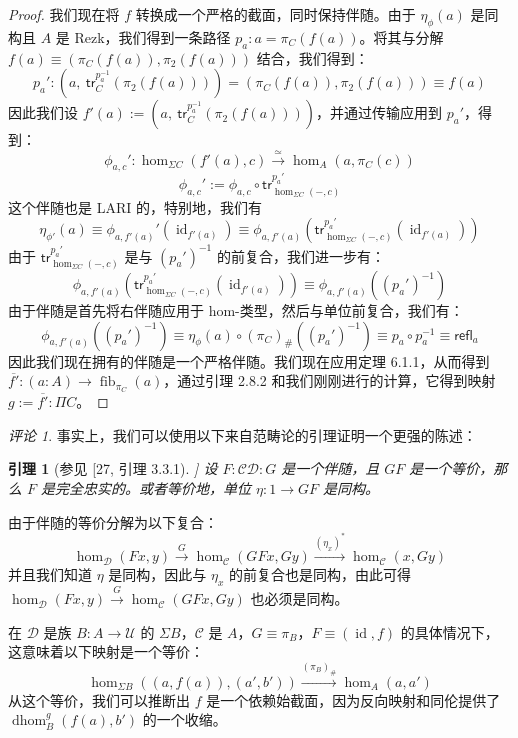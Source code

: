 \documentclass{ctexrep}
\theoremstyle{plain}
\newtheorem{lemma}[theorem]{引理}
\theoremstyle{definition}
\theoremstyle{remark}
\newtheorem{remark}[theorem]{评论}
\theoremstyle{definition}
\theoremstyle{definition}
\theoremstyle{definition}
\newcommand{\coloneqq}{\mathrel{:=}}
\newcommand{\fib}{\operatorname{fib}}
\newcommand{\tr}{\mathsf{tr}}
\newcommand{\refl}{\mathsf{refl}}
\newcommand{\id}{\operatorname{id}}
\newcommand{\UU}{\mathcal{U}}
\newcommand{\dhom}{\operatorname{dhom}}
\begin{document}
\begin{proof}
我们现在将 $f$ 转换成一个严格的截面，同时保持伴随。由于 $\eta_\phi(a)$ 是同构且 $A$ 是 Rezk，我们得到一条路径 $p_a:a = \pi_C(f(a))$。将其与分解 $f(a) \equiv (\pi_C(f(a)), \pi_2(f(a)))$ 结合，我们得到：
\[
p_a': \left(a,\ \tr_C^{p_a^{-1}}(\pi_2(f(a)))\right) = (\pi_C(f(a)),\pi_2(f(a))) \equiv f(a)
\]
因此我们设 $f'(a) \coloneqq \left(a,\ \tr_C^{p_a^{-1}}(\pi_2(f(a)))\right)$，并通过传输应用到 $p_a'$，得到：
\[
\phi_{a,c}': \hom_{\Sigma C}(f'(a),c) \xrightarrow{\simeq} \hom_A(a,\pi_C(c))
\]
\[
\phi_{a,c}' \coloneqq \phi_{a,c} \circ \tr_{\hom_{\Sigma C}(-,c)}^{p_a'}
\]
这个伴随也是 LARI 的，特别地，我们有
\[
\eta_{\phi'}(a) \equiv \phi_{a,f'(a)}'(\id_{f'(a)}) \equiv \phi_{a,f'(a)}\left(\tr_{\hom_{\Sigma C}(-,c)}^{p_a'}(\id_{f'(a)})\right)
\]
由于 $\tr_{\hom_{\Sigma C}(-,c)}^{p_a'}$ 是与 $(p_a')^{-1}$ 的前复合，我们进一步有：
\[
\phi_{a,f'(a)}\left(\tr_{\hom_{\Sigma C}(-,c)}^{p_a'}(\id_{f'(a)})\right) \equiv \phi_{a,f'(a)}\left((p_a')^{-1}\right)
\]
由于伴随是首先将右伴随应用于 hom-类型，然后与单位前复合，我们有：
\[
\phi_{a,f'(a)}\left((p_a')^{-1}\right) \equiv \eta_\phi(a) \circ (\pi_C)_{\#}\left((p_a')^{-1}\right) \equiv p_a \circ p_a^{-1} \equiv \refl_a
\]
因此我们现在拥有的伴随是一个严格伴随。我们现在应用定理 6.1.1，从而得到 $\overline{f'}:(a:A) \to \fib_{\pi_C}(a)$，通过引理 2.8.2 和我们刚刚进行的计算，它得到映射 $g \coloneqq \overline{f'}:\Pi C$。
\end{proof}

\begin{remark}
事实上，我们可以使用以下来自范畴论的引理证明一个更强的陈述：
\begin{lemma}[参见 [27, 引理 3.3.1]]
设 $F:\mathcal{C}\mathcal{D}:G$ 是一个伴随，且 $GF$ 是一个等价，那么 $F$ 是完全忠实的。或者等价地，单位 $\eta:1\to GF$ 是同构。
\end{lemma}
由于伴随的等价分解为以下复合：
\[
\hom_{\mathcal{D}}(Fx,y) \xrightarrow{G} \hom_{\mathcal{C}}(GFx,Gy) \xrightarrow{(\eta_x)^*} \hom_{\mathcal{C}}(x,Gy)
\]
并且我们知道 $\eta$ 是同构，因此与 $\eta_x$ 的前复合也是同构，由此可得 $\hom_{\mathcal{D}}(Fx,y) \xrightarrow{G} \hom_{\mathcal{C}}(GFx,Gy)$ 也必须是同构。

在 $\mathcal{D}$ 是族 $B:A\to\UU$ 的 $\Sigma B$，$\mathcal{C}$ 是 $A$，$G\equiv \pi_B$，$F\equiv (\id,f)$ 的具体情况下，这意味着以下映射是一个等价：
\[
\hom_{\Sigma B}((a,f(a)), (a',b')) \xrightarrow{(\pi_B)_{\#}} \hom_A(a,a')
\]
从这个等价，我们可以推断出 $f$ 是一个依赖始截面，因为反向映射和同伦提供了 $\dhom_B^g(f(a),b')$ 的一个收缩。
\end{remark}
\end{document}

